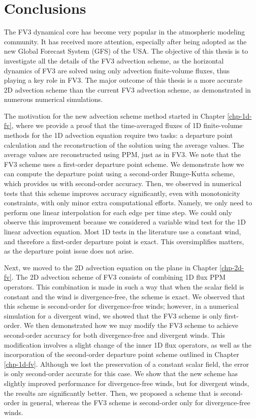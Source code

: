 \chapter{Conclusions}
\label{chp-conclusions}
The FV3 dynamical core has become very popular in the atmospheric modeling community.
It has received more attention, especially after being adopted as the new Global Forecast System (GFS) of the USA.
The objective of this thesis is to investigate all the details of the FV3 advection scheme,
as the horizontal dynamics of FV3 are solved using only advection finite-volume fluxes, thus playing a key role in FV3.
The major outcome of this thesis is a more accurate 2D advection scheme than the current FV3 advection scheme, as demonstrated in numerous numerical simulations.

The motivation for the new advection scheme method started in Chapter \ref{chp-1d-fv}, 
where we provide a proof that the time-averaged fluxes of 1D finite-volume methods for the 1D advection equation require two tasks: 
a departure point calculation and the reconstruction of the solution using the average values.
The average values are reconstructed using PPM, just as in FV3.
We note that the FV3 scheme uses a first-order departure point scheme. 
We demonstrate how we can compute the departure point using a second-order Runge-Kutta scheme, which provides us with second-order accuracy.
Then, we observed in numerical tests that this scheme improves accuracy significantly,  even with monotonicity constraints,
with only minor extra computational efforts.
Namely, we only need to perform one linear interpolation for each edge per time step.
We could only observe this improvement because we considered a  variable wind test for the 1D linear advection equation. 
Most 1D tests in the literature use a constant wind, and therefore a first-order departure point is exact.
This oversimplifies matters, as the departure point issue does not arise.

Next, we moved to the 2D advection equation on the plane in Chapter \ref{chp-2d-fv}.
The 2D advection scheme of FV3 consists of combining 1D flux PPM operators.
This combination is made in such a way that when the scalar field is constant and the wind is divergence-free, the scheme is exact.
We observed that this scheme is second-order for divergence-free winds;
however, in a numerical simulation for a divergent wind, we showed that the FV3 scheme is only first-order.
We then demonstrated how we may modify the FV3 scheme to achieve second-order accuracy for both divergence-free and divergent winds. 
This modification involves a slight change of the inner 1D flux operators,
as well as the incorporation of the second-order departure point scheme outlined in Chapter \ref{chp-1d-fv}.
Although we lost the preservation of a constant scalar field, the error is only second-order accurate for this case.
We show that the new scheme has slightly improved performance for divergence-free winds, but for divergent winds, the results are significantly better.
Then, we proposed a scheme that is second-order in general, whereas the FV3 scheme is second-order only for divergence-free winds.

